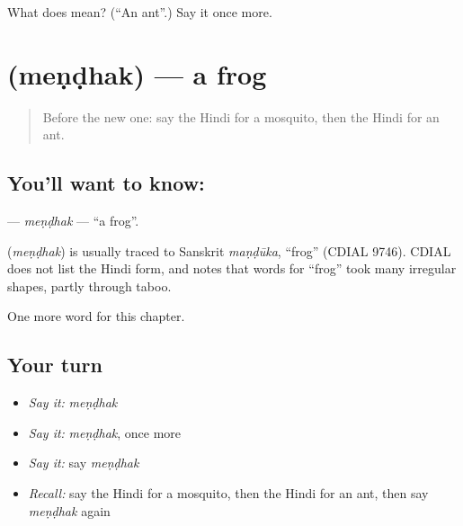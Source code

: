 \begin{tcolorbox}[breakable,colback=teal!4,colframe=teal!35!black,title={Before you move on}]
What does  mean? (\textquotedblleft{}An ant\textquotedblright{}.) Say it once more.
\end{tcolorbox}
\section[\texorpdfstring{\hi{मेंढक} (meṇḍhak)}{मेंढक (meṇḍhak)}]{ (meṇḍhak) — a frog}

\label{lesson:HI-C149-mendhak}



\begin{quote}
Before the new one: say the Hindi for a mosquito, then the Hindi for an ant.
\end{quote}

\subsection*{You'll want to know: }
\textbf{} — \emph{meṇḍhak} — \textquotedblleft{}a frog\textquotedblright{}.

\begin{cousinweb}
\textbf{} (\emph{meṇḍhak}) is usually traced to Sanskrit \emph{maṇḍūka}, \textquotedblleft{}frog\textquotedblright{} (CDIAL 9746). CDIAL does not list the Hindi form, and notes that words for \textquotedblleft{}frog\textquotedblright{} took many irregular shapes, partly through taboo.
\end{cousinweb}

\begin{grammarlens}[title={What you've built}]
One more word for this chapter.
\end{grammarlens}

\subsection*{Your turn}
\begin{itemize}
\raggedright
  \item \emph{Say it:} \emph{meṇḍhak}
  \item \emph{Say it:} \emph{meṇḍhak}, once more
  \item \emph{Say it:} say \emph{meṇḍhak}
  \item \emph{Recall:} say the Hindi for a mosquito, then the Hindi for an ant, then say \emph{meṇḍhak} again
\end{itemize}

